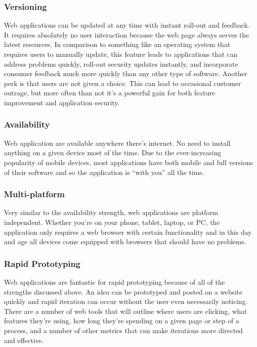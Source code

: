 \documentclass[11pt]{article}
\begin{document}
\subsubsection{Versioning}
Web applications can be updated at any time with instant roll-out and feedback. It requires absolutely no user interaction because the web page always serves the latest resources. In comparison to something like an operating system that requires users to manually update, this feature leads to applications that can address problems quickly, roll-out security updates instantly, and incorporate consumer feedback much more quickly than any other type of software. Another perk is that users are not given a choice. This can lead to occasional customer outrage, but more often than not it's a powerful gain for both feature improvement and application security.

\subsubsection{Availability}
Web application are available anywhere there's internet. No need to install anything on a given device most of the time. Due to the ever-increasing popularity of mobile devices, most applications have both mobile and full versions of their software and so the application is ``with you'' all the time.

\subsubsection{Multi-platform}
Very similar to the availability strength, web applications are platform independent. Whether you're on your phone, tablet, laptop, or PC, the application only requires a web browser with certain functionality and in this day and age all devices come equipped with browsers that should have no problems.

\subsubsection{Rapid Prototyping}
Web applications are fantastic for rapid prototyping because of all of the strengths discussed above. An idea can be prototyped and posted on a website quickly and rapid iteration can occur without the user even necessarily noticing. There are a number of web tools that will outline where users are clicking, what features they're using, how long they're spending on a given page or step of a process, and a number of other metrics that can make iterations more directed and effective.
\end{document}

